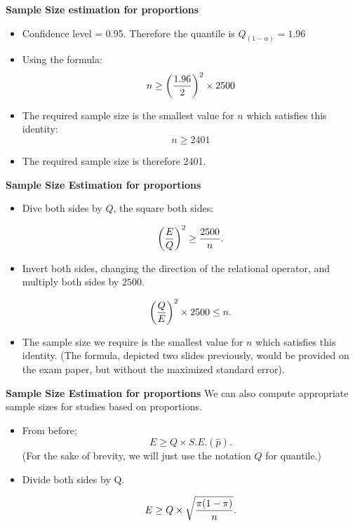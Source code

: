 
\textbf{Sample Size estimation for proportions}

\begin{itemize}
\item Confidence level = 0.95. Therefore the quantile is $Q_{(1-\alpha)} = 1.96$
\item Using the formula: \[ n \geq \left({1.96 \over 2 }\right)^2 \times 2500  \]
\item The required sample size is the smallest value for $n$ which satisfies this identity: \[ n \geq 2401  \]
\item The required sample size is therefore 2401.
\end{itemize}









\textbf{Sample Size Estimation for proportions}

\begin{itemize}

\item Dive both sides by $Q$, the square both sides:

\[ \left({E\over Q}\right)^2 \geq {2500 \over n}. \]

\item Invert both sides, changing the direction of the relational operator, and multiply both sides by $2500$.

\[ \left({Q\over E}\right)^2 \times 2500 \leq n. \]

\item The sample size we require is the smallest value for $n$ which satisfies this identity. (The formula,  depicted two slides previously, would be provided on the exam paper, but without the maximized standard error).
\end{itemize}








\textbf{Sample Size Estimation for proportions}
We can also compute appropriate sample sizes for studies based on proportions.
\begin{itemize}
\item From before; \[ E \geq Q \times S.E.(\hat{p}). \]
(For the sake of brevity, we will just use the notation $Q$ for quantile.)

\item Divide both sides by Q.

\[ E \geq Q \times \sqrt{ {\pi(1-\pi)  \over n} }. \]

\end{itemize}


